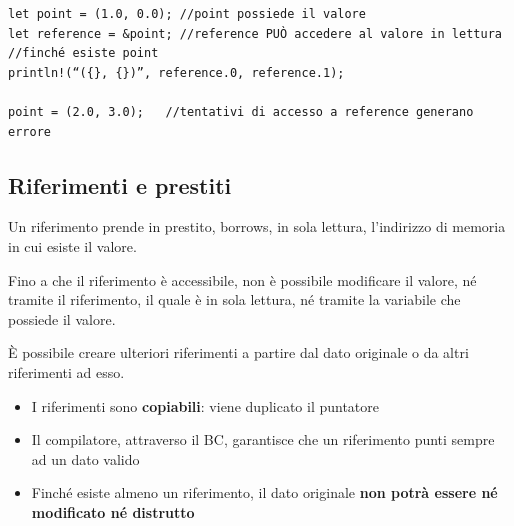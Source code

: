\begin{verbatim}
let point = (1.0, 0.0); //point possiede il valore
let reference = &point; //reference PUÒ accedere al valore in lettura
//finché esiste point
println!(“({}, {})”, reference.0, reference.1);

point = (2.0, 3.0);   //tentativi di accesso a reference generano errore
\end{verbatim}


\subsection{Riferimenti e prestiti}

Un riferimento prende in prestito, borrows, in sola lettura, l'indirizzo di memoria in cui esiste il valore.

Fino a che il riferimento è accessibile, non è possibile modificare il valore, né tramite il riferimento, il quale è in sola lettura, né tramite la variabile che possiede il valore.\newline

È possibile creare ulteriori riferimenti a partire dal dato originale o da altri riferimenti ad esso.

\begin{itemize}
  \item I riferimenti sono \textbf{copiabili}: viene duplicato il puntatore
  \item Il compilatore, attraverso il BC, garantisce che un riferimento punti sempre ad un dato valido
  \item Finché esiste almeno un riferimento, il dato originale \textbf{non potrà essere né modificato né distrutto}
\end{itemize}

